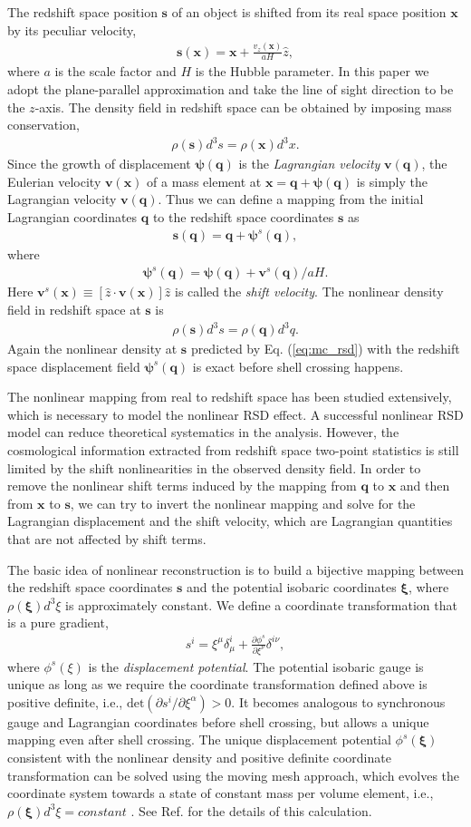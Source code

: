 \documentclass[aps,prd,twocolumn,superscriptaddress,groupedaddress,nofootinbib,amsfont]{revtex4}  %
\newcommand{\mr}{\mathrm}
\newcommand{\bea}{\begin{eqnarray}}
\newcommand{\eea}{\end{eqnarray}}
\newcommand{\bmp}{\bm{\psi}}
\newcommand{\bmv}{\bm{v}}
\newcommand{\bmx}{\bm{x}}
\newcommand{\bms}{\bm{s}}
\newcommand{\bmq}{\bm{q}}
\newcommand{\bmxi}{\bm{\xi}}
\begin{document}
The redshift space position $\bms$ of an object is shifted from its real space 
position $\bmx$ by its peculiar velocity,
\bea
\bms(\bmx)=\bmx+\frac{v_z(\bmx)}{aH}\hat{z},
\eea
where $a$ is the scale factor and $H$ is the Hubble parameter. In this paper 
we adopt the plane-parallel approximation and take the line of sight direction 
to be the $z$-axis. The density field in redshift space can be obtained by 
imposing mass conservation,
\bea
\rho(\bms)d^3s=\rho(\bmx)d^3x.
\eea
Since the growth of displacement $\bmp(\bmq)$ is the {\it Lagrangian velocity}
$\bmv(\bmq)$, the Eulerian velocity $\bmv(\bmx)$ of a mass element at 
$\bmx=\bmq+\bmp(\bmq)$ is simply the Lagrangian velocity $\bmv(\bmq)$.
Thus we can define a mapping from the initial Lagrangian coordinates $\bmq$ to 
the redshift space coordinates $\bms$ as
\bea
\bms(\bmq)=\bmq+\bmp^s(\bmq),
\eea
where
\bea
\bmp^s(\bmq)=\bmp(\bmq)+{\bmv^s(\bmq)}/{aH}.
\eea
Here $\bmv^s(\bmx)\equiv[\hat{z}\cdot\bmv(\bmx)]\hat{z}$ is called the {\it shift velocity}.
The nonlinear density field in redshift space at $\bms$ is 
\bea
\label{eq:mc_rsd}
\rho(\bms)d^3s=\rho(\bmq)d^3q.
\eea
Again the nonlinear density at $\bms$ predicted by Eq. (\ref{eq:mc_rsd})
with the redshift space displacement field $\bmp^s(\bmq)$ is exact before shell
crossing happens.

The nonlinear mapping from real to redshift space has been studied extensively,
which is necessary to model the nonlinear RSD effect. A successful nonlinear 
RSD model can reduce theoretical systematics in the analysis. However, the 
cosmological information extracted from redshift space two-point statistics 
is still limited by the shift nonlinearities in the observed density field. 
In order to remove the nonlinear shift terms induced by the mapping from $\bmq$
to $\bmx$ and then from $\bmx$ to $\bms$, we can try to invert the nonlinear 
mapping and solve for the Lagrangian displacement and the shift velocity, which
are Lagrangian quantities that are not affected by shift terms.

The basic idea of nonlinear reconstruction is to build a bijective mapping between the redshift space coordinates $\bms$ and the potential isobaric coordinates $\bmxi$, where $\rho(\bmxi)d^3\xi$ is approximately constant.
We define a coordinate transformation that is a pure gradient,
\bea
s^i=\xi^{\mu}\delta^i_{\mu}+\frac{\partial\phi^s}{\partial\xi^{\nu}}\delta^{i\nu},
\eea
where $\phi^s(\xi)$ is the {\it displacement potential}. 
The potential isobaric gauge is unique as long as we require the coordinate 
transformation defined above is positive definite, i.e., $\mr{det}(\partial s^i/\partial\xi^{\alpha})>0$. 
It becomes analogous to synchronous gauge and Lagrangian coordinates before 
shell crossing, but allows a unique mapping even after shell crossing.
The unique displacement potential $\phi^s(\bmxi)$ consistent with the nonlinear
density and positive definite coordinate transformation can be solved using
the moving mesh approach, which evolves the coordinate system towards a state 
of constant mass per volume element, i.e., $\rho(\bmxi)d^3\xi=constant$
\cite{1995ApJS..100..269P,1998ApJS..115...19P}.
See Ref. \cite{2016HMZ} for the details of this calculation.
\end{document}
